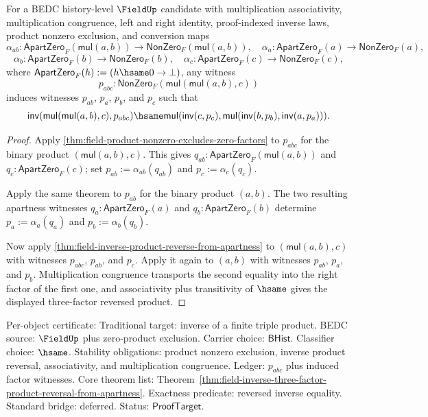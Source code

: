 \begin{theorem}
\label{thm:field-inverse-three-factor-product-reversal-from-apartness}
For a BEDC history-level $\FieldUp$ candidate with multiplication associativity,
multiplication congruence, left and right identity, proof-indexed inverse laws,
product nonzero exclusion, and conversion maps
$$
\alpha_{ab}:\mathsf{ApartZero}_F(\mathsf{mul}(a,b))\to
\mathsf{NonZero}_F(\mathsf{mul}(a,b)),
\quad
\alpha_a:\mathsf{ApartZero}_F(a)\to\mathsf{NonZero}_F(a),
$$
$$
\alpha_b:\mathsf{ApartZero}_F(b)\to\mathsf{NonZero}_F(b),
\quad
\alpha_c:\mathsf{ApartZero}_F(c)\to\mathsf{NonZero}_F(c),
$$
where $\mathsf{ApartZero}_F(h):=(h\hsame0\to\bot)$, any witness
$$
p_{abc}:\mathsf{NonZero}_F(\mathsf{mul}(\mathsf{mul}(a,b),c))
$$
induces witnesses $p_{ab}$, $p_a$, $p_b$, and $p_c$ such that
$$
\mathsf{inv}(\mathsf{mul}(\mathsf{mul}(a,b),c),p_{abc})\hsame
\mathsf{mul}(\mathsf{inv}(c,p_c),
\mathsf{mul}(\mathsf{inv}(b,p_b),\mathsf{inv}(a,p_a))).
$$
\end{theorem}
\begin{proof}
Apply \autoref{thm:field-product-nonzero-excludes-zero-factors} to
$p_{abc}$ for the binary product $(\mathsf{mul}(a,b),c)$. This gives
$q_{ab}:\mathsf{ApartZero}_F(\mathsf{mul}(a,b))$ and
$q_c:\mathsf{ApartZero}_F(c)$; set $p_{ab}:=\alpha_{ab}(q_{ab})$ and
$p_c:=\alpha_c(q_c)$.

Apply the same theorem to $p_{ab}$ for the binary product $(a,b)$. The two
resulting apartness witnesses $q_a:\mathsf{ApartZero}_F(a)$ and
$q_b:\mathsf{ApartZero}_F(b)$ determine $p_a:=\alpha_a(q_a)$ and
$p_b:=\alpha_b(q_b)$.

Now apply \autoref{thm:field-inverse-product-reverse-from-apartness} to
$(\mathsf{mul}(a,b),c)$ with witnesses $p_{abc}$, $p_{ab}$, and $p_c$. Apply it
again to $(a,b)$ with witnesses $p_{ab}$, $p_a$, and $p_b$. Multiplication
congruence transports the second equality into the right factor of the first
one, and associativity plus transitivity of $\hsame$ gives the displayed
three-factor reversed product.
\end{proof}

Per-object certificate: Traditional target: inverse of a finite triple product.
BEDC source: $\FieldUp$ plus zero-product exclusion. Carrier choice:
$\mathsf{BHist}$. Classifier choice: $\hsame$. Stability obligations: product
nonzero exclusion, inverse product reversal, associativity, and multiplication
congruence. Ledger: $p_{abc}$ plus induced factor witnesses. Core theorem list:
Theorem~\ref{thm:field-inverse-three-factor-product-reversal-from-apartness}.
Exactness predicate: reversed inverse equality. Standard bridge: deferred.
Status: $\mathsf{ProofTarget}$.

